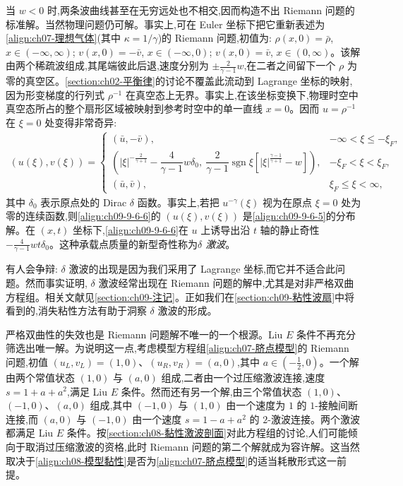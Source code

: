 \documentclass[../../main.tex]{subfiles}
\begin{document}
当 $w<0$ 时,两条波曲线甚至在无穷远处也不相交,因而构造不出 Riemann 问题的标准解。当然物理问题仍可解。事实上,可在 Euler 坐标下把它重新表述为\eqref{align:ch07-理想气体}(其中 $\kappa=1/\gamma$)的 Riemann 问题,初值为: $\rho(x,0)=\bar{\rho}$, $x\in(-\infty,\infty)$; $v(x,0)=-\bar{v}$, $x\in(-\infty,0)$; $v(x,0)=\bar{v}$, $x\in(0,\infty)$。该解由两个稀疏波组成,其尾端彼此后退,速度分别为 $\pm\frac{2}{\gamma-1}w$,在二者之间留下一个 $\rho$ 为零的真空区。\cref{section:ch02-平衡律}的讨论不覆盖此流动到 Lagrange 坐标的映射,因为形变梯度的行列式 $\rho^{-1}$ 在真空态上无界。事实上,在该坐标变换下,物理时空中真空态所占的整个扇形区域被映射到参考时空中的单一直线 $x=0$。因而 $u=\rho^{-1}$ 在 $\xi=0$ 处变得非常奇异:
\begin{align}
(u(\xi),v(\xi))=
\begin{cases}
(\bar{u},-\bar{v}),&-\infty<\xi\leqslant-\xi_{F},\\[1mm]
\left(|\xi|^{-\frac{2}{\gamma+1}}-\dfrac{4}{\gamma-1}w\delta_{0},\ \dfrac{2}{\gamma-1}\operatorname{sgn}\xi\left[|\xi|^{\frac{\gamma-1}{\gamma+1}}-w\right]\right),&-\xi_{F}<\xi<\xi_{F},\\[3mm]
(\bar{u},\bar{v}),&\xi_{F}\leqslant\xi<\infty,
\end{cases}
\label{align:ch09-9-6-6}
\end{align}
其中 $\delta_{0}$ 表示原点处的 Dirac $\delta$ 函数。事实上,若把 $u^{-\gamma}(\xi)$ 视为在原点 $\xi=0$ 处为零的连续函数,则\eqref{align:ch09-9-6-6}的 $(u(\xi),v(\xi))$ 是\eqref{align:ch09-9-6-5}的分布解。在 $(x,t)$ 坐标下,\eqref{align:ch09-9-6-6}在 $u$ 上诱导出沿 $t$ 轴的静止奇性 $-\frac{4}{\gamma-1}wt\delta_{0}$。这种承载点质量的新型奇性称为\emph{$\delta$ 激波}。

有人会争辩: $\delta$ 激波的出现是因为我们采用了 Lagrange 坐标,而它并不适合此问题。然而事实证明, $\delta$ 激波经常出现在 Riemann 问题的解中,尤其是对非严格双曲方程组。相关文献见\cref{section:ch09-注记}。正如我们在\cref{section:ch09-粘性波扇}中将看到的,消失粘性方法有助于洞察 $\delta$ 激波的形成。

严格双曲性的失效也是 Riemann 问题解不唯一的一个根源。Liu $E$ 条件不再充分筛选出唯一解。为说明这一点,考虑模型方程组\eqref{align:ch07-脐点模型}的 Riemann 问题,初值 $(u_{L},v_{L})=(1,0)$、$(u_{R},v_{R})=(a,0)$,其中 $a\in(-\frac{1}{2},0)$。一个解由两个常值状态 $(1,0)$ 与 $(a,0)$ 组成,二者由一个过压缩激波连接,速度 $s=1+a+a^{2}$,满足 Liu $E$ 条件。然而还有另一个解,由三个常值状态 $(1,0)$、$(-1,0)$、$(a,0)$ 组成,其中 $(-1,0)$ 与 $(1,0)$ 由一个速度为 $1$ 的 $1$-接触间断连接,而 $(a,0)$ 与 $(-1,0)$ 由一个速度 $s=1-a+a^{2}$ 的 $2$-激波连接。两个激波都满足 Liu $E$ 条件。按\cref{section:ch08-黏性激波剖面}对此方程组的讨论,人们可能倾向于取消过压缩激波的资格,此时 Riemann 问题的第二个解就成为容许解。这当然取决于\eqref{align:ch08-模型黏性}是否为\eqref{align:ch07-脐点模型}的适当耗散形式这一前提。
\end{document}
